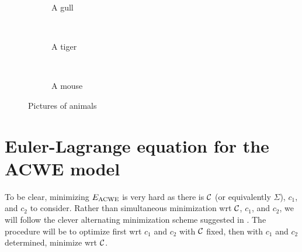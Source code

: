 \begin{figure}
	\centering
	\begin{subfigure}[b]{0.31\textwidth}
		\caption{A gull}
		\label{fig:gull}
	\end{subfigure}
	~ %
	\begin{subfigure}[b]{0.31\textwidth}
		\caption{A tiger}
		\label{fig:tiger}
	\end{subfigure}
	~ %
	\begin{subfigure}[b]{0.31\textwidth}
		\caption{A mouse}
		\label{fig:mouse}
	\end{subfigure}
	\caption{Pictures of animals}\label{fig:fitting}
\end{figure}


\section{Euler-Lagrange equation for the ACWE model}
To be clear, minimizing $E_\textrm{ACWE}$ is very hard as there is $\mathcal{C}$ (or equivalently $\Sigma$), $c_1$, and $c_2$ to consider. Rather than simultaneous minimization wrt $\mathcal{C}$, $c_1$, and $c_2$, we will follow the clever alternating minimization scheme suggested in \cite{chan2001active}. The procedure will be to optimize first wrt $c_1$ and $c_2$ with $\mathcal{C}$ fixed, then with $c_1$ and $c_2$ determined, minimize wrt $\mathcal{C}$.

